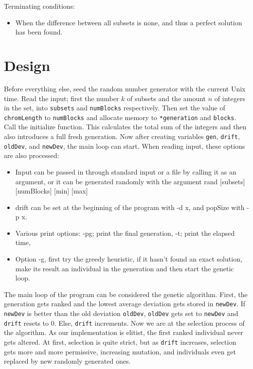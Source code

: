\documentclass[a4paper,10pt]{article}
\begin{document}
Terminating conditions:
\begin{itemize}
\item When the difference between all subsets is none, and thus a perfect solution has been found.
\end{itemize}

\section{Design}
Before everything else, seed the random number generator with the current Unix time.
Read the input; first the number $k$ of subsets and the amount $n$ of integers in the set, into {\tt subsets} and {\tt numBlocks} respectively.
Then set the value of {\tt chromLength} to {\tt numBlocks} and allocate memory to {\tt **generation} and {\tt *blocks}.
Call the initialize function. This calculates the total sum of the integers and then also introduces a full fresh generation.
Now after creating variables {\tt gen}, {\tt drift}, {\tt oldDev}, and {\tt newDev}, the main loop can start.
\newline 
\newline
When reading input, these options are also processed:
\begin{itemize}
  \item Input can be passed in through standard input or a file by calling it as an argument, or it can be generated randomly with the argument rand [subsets] [numBlocks] [min] [max]
  \item drift can be set at the beginning of the program with -d x, and popSize with -p x.
  \item Various print options: -pg; print the final generation, -t; print the elapsed time, 
  \item Option -g, first try the greedy heuristic, if it hasn't found an exact solution, make its result an individual in the generation and then start the genetic loop.
\end{itemize}
The main loop of the program can be considered the genetic algorithm.
First, the generation gets ranked and the lowest average deviation gets stored in {\tt newDev}.
If {\tt newDev} is better than the old deviation {\tt oldDev}, {\tt oldDev} gets set to {\tt newDev} and {\tt drift} resets to 0.
Else, {\tt drift} increments.
Now we are at the selection process of the algorithm.
As our implementation is elitist, the first ranked individual never gets altered.
At first, selection is quite strict, but as {\tt drift} increases, selection gets more and more permissive, increasing mutation, and individuals even get replaced by new randomly generated ones.
\end{document}
